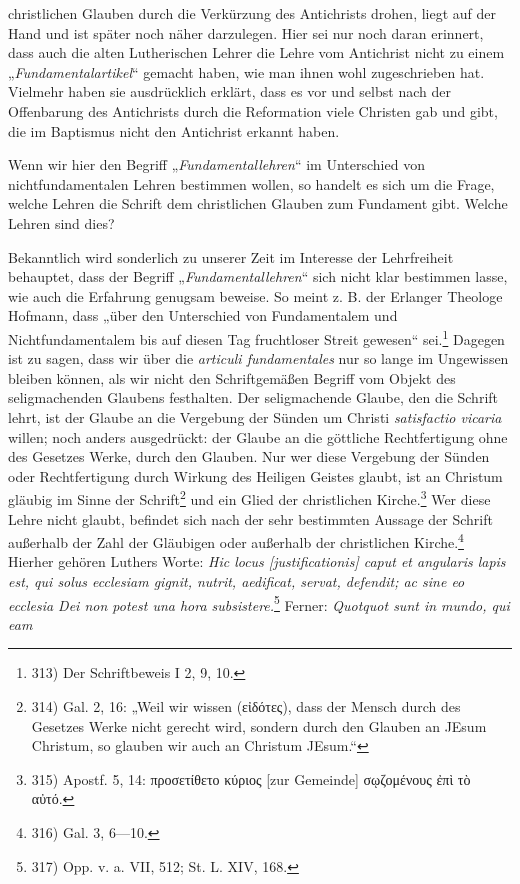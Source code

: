 christlichen Glauben durch die Verkürzung des Antichrists drohen, liegt auf der Hand und ist später noch näher darzulegen. Hier sei nur noch daran erinnert, dass auch die alten Lutherischen Lehrer die Lehre vom Antichrist nicht zu einem „\textit{Fundamentalartikel}“ gemacht haben, wie man ihnen wohl zugeschrieben hat. Vielmehr haben sie ausdrücklich erklärt, dass es vor und selbst nach der Offenbarung des Antichrists durch die Reformation viele Christen gab und gibt, die im Baptismus nicht den Antichrist erkannt haben.

Wenn wir hier den Begriff „\textit{Fundamentallehren}“ im Unterschied von nichtfundamentalen Lehren bestimmen wollen, so handelt es sich um die Frage, welche Lehren die Schrift dem christlichen Glauben zum Fundament gibt. Welche Lehren sind dies?

Bekanntlich wird sonderlich zu unserer Zeit im Interesse der Lehrfreiheit behauptet, dass der Begriff „\textit{Fundamentallehren}“ sich nicht klar bestimmen lasse, wie auch die Erfahrung genugsam beweise. So meint z. B. der Erlanger Theologe Hofmann, dass „über den Unterschied von Fundamentalem und Nichtfundamentalem bis auf diesen Tag fruchtloser Streit gewesen“ sei.\footnote{313) Der Schriftbeweis I 2, 9, 10.} Dagegen ist zu sagen, dass wir über die \textit{articuli fundamentales} nur so lange im Ungewissen bleiben können, als wir nicht den Schriftgemäßen Begriff vom Objekt des seligmachenden Glaubens festhalten. Der seligmachende Glaube, den die Schrift lehrt, ist der Glaube an die Vergebung der Sünden um Christi \textit{satisfactio vicaria} willen; noch anders ausgedrückt: der Glaube an die göttliche Rechtfertigung ohne des Gesetzes Werke, durch den Glauben. Nur wer diese Vergebung der Sünden oder Rechtfertigung durch Wirkung des Heiligen Geistes glaubt, ist an Christum gläubig im Sinne der Schrift\footnote{314) Gal. 2, 16: „Weil wir wissen (\textgreek{εἰδότες}), dass der Mensch durch des Gesetzes Werke nicht gerecht wird, sondern durch den Glauben an JEsum Christum, so glauben wir auch an Christum JEsum.“} und ein Glied der christlichen Kirche.\footnote{315) Apostf. 5, 14: \textgreek{προσετίθετο κύριος [zur Gemeinde] σῳζομένους ἐπὶ τὸ αὐτό}.} Wer diese Lehre nicht glaubt, befindet sich nach der sehr bestimmten Aussage der Schrift außerhalb der Zahl der Gläubigen oder außerhalb der christlichen Kirche.\footnote{316) Gal. 3, 6—10.} Hierher gehören Luthers Worte: \textit{Hic locus [justificationis] caput et angularis lapis est, qui solus ecclesiam gignit, nutrit, aedificat, servat, defendit; ac sine eo ecclesia Dei non potest una hora subsistere.}\footnote{317) Opp. v. a. VII, 512; St. L. XIV, 168.} Ferner: \textit{Quotquot sunt in mundo, qui eam}